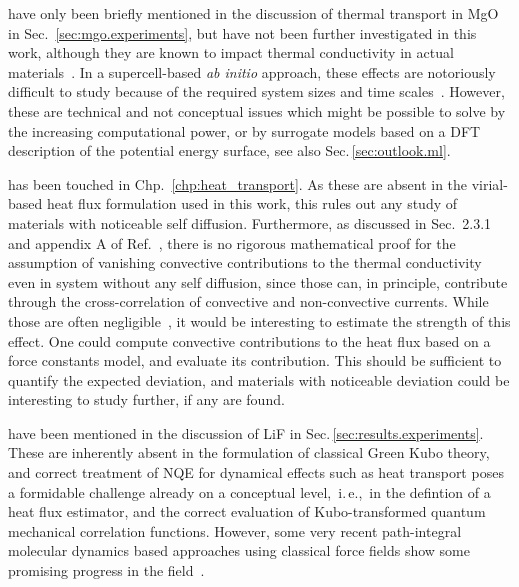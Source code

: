  have only been briefly mentioned in the discussion of thermal transport in MgO in Sec.~\ref{sec:mgo.experiments}, but have not been further investigated in this work, although they are known to impact thermal conductivity in actual materials~\cite{Bisson2000}. In a supercell-based \emph{ab initio} approach, these effects are notoriously difficult to study because of the required system sizes and time scales~\cite{Gibbons2011}. However, these are technical and not conceptual issues which might be possible to solve by the increasing computational power, or by surrogate models based on a DFT description of the potential energy surface, see also Sec.\,\ref{sec:outlook.ml}.

 has been touched in Chp.~\ref{chp:heat_transport}. As these are absent in the virial-based heat flux formulation used in this work, this rules out any study of materials with noticeable self diffusion. Furthermore, as discussed in Sec.~2.3.1 and appendix A of Ref.~\cite{ErcoleThesis}, there is no rigorous mathematical proof for the assumption of vanishing convective contributions to the thermal conductivity even in system without any self diffusion, since those can, in principle, contribute through the cross-correlation of convective and non-convective currents. While those are often negligible~\cite{Vogelsang1987}, it would be interesting to estimate the strength of this effect. One could compute convective contributions to the heat flux based on a force constants model, and evaluate its contribution. This should be sufficient to quantify the expected deviation, and materials with noticeable deviation could be interesting to study further, if any are found.

 have been mentioned in the discussion of LiF in Sec.\,\ref{sec:results.experiments}. These are inherently absent in the formulation of classical Green Kubo theory, and correct treatment of NQE for dynamical effects such as heat transport poses a formidable challenge already on a conceptual level,~i.\,e.,~in the defintion of a heat flux estimator, and the correct evaluation of Kubo-transformed quantum mechanical correlation functions. However, some very recent path-integral molecular dynamics based approaches using classical force fields show some promising progress in the field~\cite{Luo2020,Sutherland2021}.

